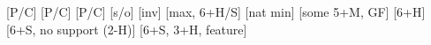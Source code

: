 \begin{bidsemi}
[P/C]
[P/C]
[P/C]
[s/o]
[inv]
    [max, 6+H/S]
    [nat min]
[some 5+M, GF]
    [6+H]
    [6+S, no support (2-H)]
    [6+S, 3+H, feature]
\end{bidsemi}